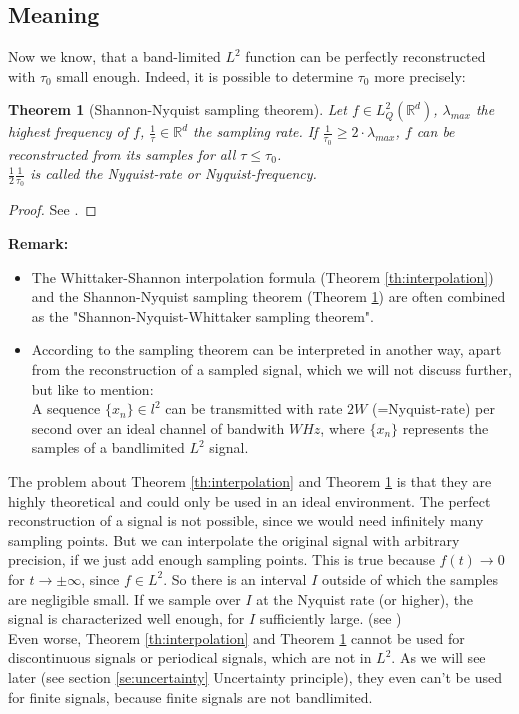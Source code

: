 \documentclass[a4paper, 11pt]{scrreprt}
\newtheorem{theorem}[defi]{Theorem}
\newcommand{\RR}{\mathbb{R}}
\newcommand{\student}[1]{\marginnote{{\normalfont\bf #1}}}
\begin{document}
\subsection{Meaning}

Now we know, that a band-limited \(L^2\) function can be perfectly reconstructed with \(\tau_0\) small enough. Indeed, it is possible to determine \(\tau_0\) more precisely:
\begin{theorem}[Shannon-Nyquist sampling theorem]
\label{th:sampling}
Let \(f\in L^2_Q(\RR^d)\), \(\lambda_{max}\) the highest frequency of \(f\), \(\frac{1}{\tau}\in \RR^d\) the sampling rate. If \(\frac{1}{\tau_0} \geq 2\cdot \lambda_{max}\), \(f\) can be reconstructed from its samples for all \(\tau \leq \tau_0\).\\
\(\frac 1 2 \frac{1}{\tau_0}\) is called the Nyquist-rate or Nyquist-frequency.
\end{theorem} 
\begin{proof}
See \cite{shannon01}.
\end{proof}

\textbf{Remark:}
\begin{itemize}
\item The Whittaker-Shannon interpolation formula (Theorem  \ref{th:interpolation}) and the Shannon-Nyquist sampling theorem (Theorem \ref{th:sampling}) are often combined as the "Shannon-Nyquist-Whittaker sampling theorem".
\item According to \cite{landau04} the sampling theorem can be interpreted in another way,  apart from the reconstruction of a sampled signal, which we will not discuss further, but like to mention: \\
A sequence \(\{x_n\}\in l^2\) can be transmitted with rate \(2W\) (=Nyquist-rate) per second over an ideal channel of bandwith \(W Hz\), where \(\{x_n\}\) represents the samples of a bandlimited \(L^2\) signal.

\end{itemize}
\student{Dominik}
The problem about Theorem  \ref{th:interpolation} and Theorem \ref{th:sampling} is that they are highly theoretical and could only be used in an ideal environment. The perfect reconstruction of a signal is not possible, since we would need infinitely many sampling points. But we can interpolate the original signal with arbitrary precision, if we just add enough sampling points. This is true because \(f(t)\to 0\) for \(t\to\pm\infty\), since \(f\in L^2\). So there is an interval \(I\) outside of which the samples are negligible small. If we sample over \(I\) at the Nyquist rate (or higher), the signal is characterized well enough, for \(I\) sufficiently large. (see \cite{marks02})\\
Even worse, Theorem  \ref{th:interpolation} and Theorem \ref{th:sampling} cannot be used for discontinuous signals or periodical signals, which are not in \(L^2\). As we will see later (see section \ref{se:uncertainty} Uncertainty principle), they even can't be used for finite signals, because finite signals are not bandlimited. \\
\end{document}

